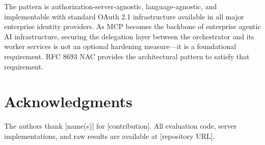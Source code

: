 \documentclass[journal]{IEEEtran}
\begin{document}
The pattern is authorization-server-agnostic, language-agnostic, and
implementable with standard OAuth 2.1 infrastructure available in all major
enterprise identity providers. As MCP becomes the backbone of enterprise
agentic AI infrastructure, securing the delegation layer between the orchestrator
and its worker services is not an optional hardening measure---it is a
foundational requirement. RFC 8693 NAC provides the architectural pattern to
satisfy that requirement.

\section*{Acknowledgments}
The authors thank [name(s)] for [contribution]. All evaluation code, server
implementations, and raw results are available at [repository URL].

\balance
\end{document}
